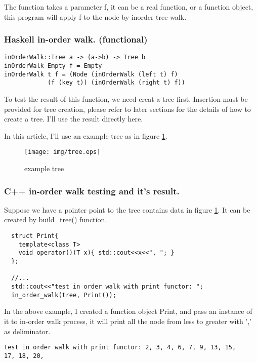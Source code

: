 \documentclass{article}
\begin{document}
The function takes a parameter f, it can be a real function, or a function
object, this program will apply f to the node by inorder tree walk.

\subsubsection*{Haskell in-order walk. (functional)}
\lstset{language=Haskell}
\begin{lstlisting}
inOrderWalk::Tree a -> (a->b) -> Tree b
inOrderWalk Empty f = Empty
inOrderWalk t f = (Node (inOrderWalk (left t) f) 
            (f (key t)) (inOrderWalk (right t) f))
\end{lstlisting}

To test the result of this function, we need creat a tree first. Insertion
must be provided for tree creation, please refer to later sections for the
details of how to create a tree. I'll use the result directly here.

In this article, I'll use an example tree as in figure \ref{fig:example-tree}.

\begin{figure}[htbp]
       \begin{center}
	\texttt{[image: img/tree.eps]}
        \caption{example tree} \label{fig:example-tree}
       \end{center}
\end{figure}

\subsubsection*{C++ in-order walk testing and it's result.}

Suppose we have a pointer point to the tree contains data in figure 
\ref{fig:example-tree}. It can be created by build\_tree() function.

\lstset{language=C++}
\begin{lstlisting}
  struct Print{
    template<class T>
    void operator()(T x){ std::cout<<x<<", "; }
  };

  //...
  std::cout<<"test in order walk with print functor: ";
  in_order_walk(tree, Print());
\end{lstlisting}

In the above example, I created a function object Print, and pass an
instance of it to in-order walk process, it will print all the node
from less to greater with ',' as deliminator.

\begin{verbatim}
test in order walk with print functor: 2, 3, 4, 6, 7, 9, 13, 15, 
17, 18, 20,
\end{verbatim}
\end{document}
